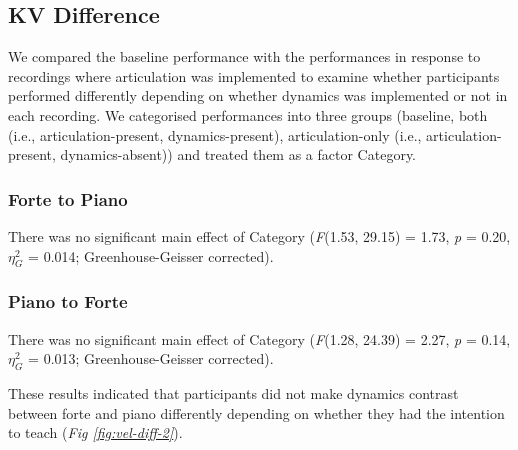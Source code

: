 \documentclass[
  man,floatsintext]{apa6}
\begin{document}
\hypertarget{kv-difference-1}{%
\subsection{KV Difference}\label{kv-difference-1}}

We compared the baseline performance with the performances in response to recordings where articulation was implemented to examine whether participants performed differently depending on whether dynamics was implemented or not in each recording. We categorised performances into three groups (baseline, both (i.e., articulation-present, dynamics-present), articulation-only (i.e., articulation-present, dynamics-absent)) and treated them as a factor Category.

\hypertarget{forte-to-piano-1}{%
\subsubsection{Forte to Piano}\label{forte-to-piano-1}}

There was no significant main effect of Category (\emph{F}(1.53, 29.15) = 1.73, \emph{p} = 0.20, \(\eta_G^2\) = 0.014; Greenhouse-Geisser corrected).

\hypertarget{piano-to-forte-1}{%
\subsubsection{Piano to Forte}\label{piano-to-forte-1}}

There was no significant main effect of Category (\emph{F}(1.28, 24.39) = 2.27, \emph{p} = 0.14, \(\eta_G^2\) = 0.013; Greenhouse-Geisser corrected).

These results indicated that participants did not make dynamics contrast between forte and piano differently depending on whether they had the intention to teach (\emph{Fig \ref{fig:vel-diff-2}}).
\end{document}
